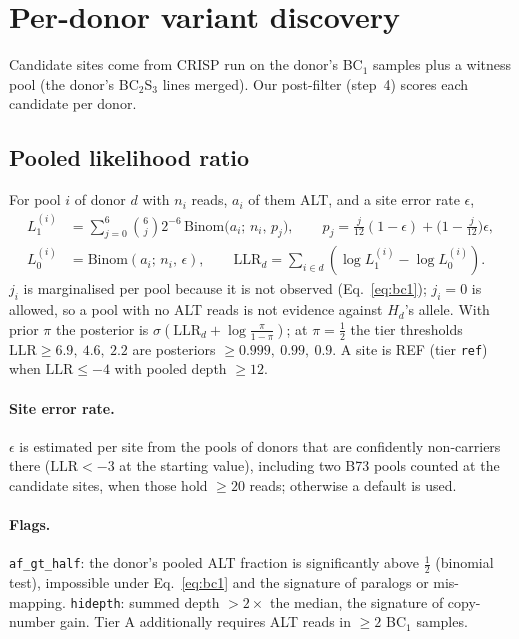 \documentclass[11pt]{article}
\newcommand{\Bin}{\mathrm{Binom}}
\newcommand{\LLR}{\mathrm{LLR}}
\newcommand{\Hd}{H_d}
\newcommand{\code}[1]{\texttt{#1}}
\begin{document}
\section{Per-donor variant discovery}
\label{sec:discovery}

Candidate sites come from CRISP \citep{bansal2010crisp} run on the donor's BC$_1$ samples plus a witness pool (the donor's BC$_2$S$_3$ lines
merged). Our post-filter (step~4) scores each candidate per donor.

\subsection{Pooled likelihood ratio}
For pool $i$ of donor $d$ with $n_i$ reads, $a_i$ of them ALT, and a site error rate $\epsilon$,
\begin{align}
L_1^{(i)} &= \sum_{j=0}^{6}\binom{6}{j}2^{-6}\,\Bin\!\big(a_i;\,n_i,\,p_j\big),\qquad p_j=\tfrac{j}{12}(1-\epsilon)+\big(1-\tfrac{j}{12}\big)\epsilon,\\
L_0^{(i)} &= \Bin(a_i;\,n_i,\,\epsilon),\qquad
\LLR_d=\sum_{i\in d}\left(\log L_1^{(i)}-\log L_0^{(i)}\right).
\label{eq:llr}
\end{align}
$j_i$ is marginalised per pool because it is not observed (Eq.~\eqref{eq:bc1}); $j_i=0$ is allowed, so a pool with no ALT reads is not evidence
against $\Hd$'s allele. With prior $\pi$ the posterior is $\sigma(\LLR_d+\log\frac{\pi}{1-\pi})$; at $\pi=\tfrac12$ the tier thresholds
$\LLR\ge6.9,\ 4.6,\ 2.2$ are posteriors $\ge0.999,\ 0.99,\ 0.9$. A site is REF (tier \code{ref}) when $\LLR\le-4$ with pooled depth
$\ge12$.

\paragraph{Site error rate.} $\epsilon$ is estimated per site from the pools of donors that are confidently non-carriers there ($\LLR<-3$ at
the starting value), including two B73 pools counted at the candidate sites, when those hold $\ge20$ reads; otherwise a default is used.

\paragraph{Flags.} \code{af\_gt\_half}: the donor's pooled ALT fraction is significantly above $\tfrac12$ (binomial test), impossible under
Eq.~\eqref{eq:bc1} and the signature of paralogs or mis-mapping. \code{hidepth}: summed depth $>2\times$ the median, the signature of copy-number
gain. Tier A additionally requires ALT reads in $\ge2$ BC$_1$ samples.
\end{document}
